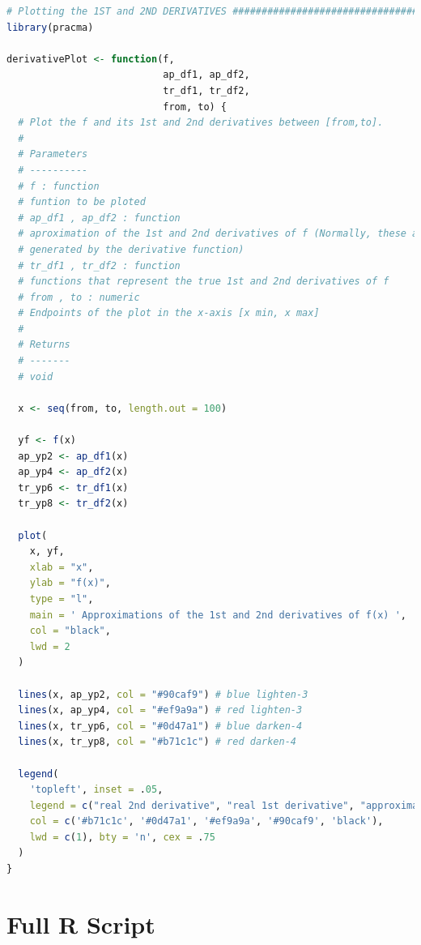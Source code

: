 \documentclass[11pt,a4paper]{article}
\begin{document}
\begin{lstlisting}[frame=trBL, language=R]
# Plotting the 1ST and 2ND DERIVATIVES ################################
library(pracma)

derivativePlot <- function(f,
                           ap_df1, ap_df2,
                           tr_df1, tr_df2,
                           from, to) {
  # Plot the f and its 1st and 2nd derivatives between [from,to].
  #
  # Parameters
  # ----------
  # f : function
  # funtion to be ploted
  # ap_df1 , ap_df2 : function
  # aproximation of the 1st and 2nd derivatives of f (Normally, these are
  # generated by the derivative function)
  # tr_df1 , tr_df2 : function
  # functions that represent the true 1st and 2nd derivatives of f
  # from , to : numeric
  # Endpoints of the plot in the x-axis [x min, x max]
  #
  # Returns
  # -------
  # void
  
  x <- seq(from, to, length.out = 100)
  
  yf <- f(x)
  ap_yp2 <- ap_df1(x)
  ap_yp4 <- ap_df2(x)
  tr_yp6 <- tr_df1(x)
  tr_yp8 <- tr_df2(x)
  
  plot(
    x, yf,
    xlab = "x",
    ylab = "f(x)",
    type = "l",
    main = ' Approximations of the 1st and 2nd derivatives of f(x) ',
    col = "black",
    lwd = 2
  )
  
  lines(x, ap_yp2, col = "#90caf9") # blue lighten-3
  lines(x, ap_yp4, col = "#ef9a9a") # red lighten-3
  lines(x, tr_yp6, col = "#0d47a1") # blue darken-4
  lines(x, tr_yp8, col = "#b71c1c") # red darken-4
  
  legend(
    'topleft', inset = .05,
    legend = c("real 2nd derivative", "real 1st derivative", "approximation 2nd derivative", "approxination 1st derivative", "f(x)"),
    col = c('#b71c1c', '#0d47a1', '#ef9a9a', '#90caf9', 'black'),
    lwd = c(1), bty = 'n', cex = .75
  )
}
\end{lstlisting}

\clearpage

\section{Full R Script}\label{sec:fullScript}
\end{document}
